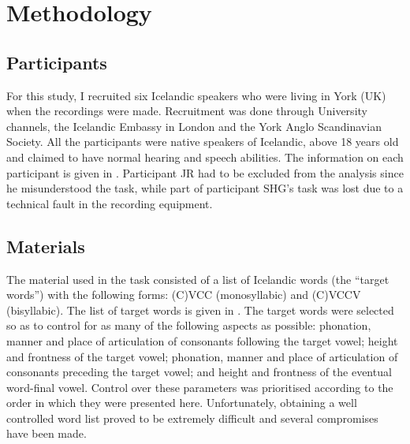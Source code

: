 \chapter{Methodology}

\section{Participants}

For this study, I recruited six Icelandic speakers who were living in York (UK) when the recordings were made.
Recruitment was done through University channels, the Icelandic Embassy in London and the York Anglo Scandinavian Society.
All the participants were native speakers of Icelandic, above 18 years old and claimed to have normal hearing and speech abilities.
The information on each participant is given in .
Participant JR had to be excluded from the analysis since he misunderstood the task, while part of participant SHG's task was lost due to a technical fault in the recording equipment.



\section{Materials}

The material used in the task consisted of a list of Icelandic words (the ``target words'') with the following forms: (C)VCC (monosyllabic) and (C)VCCV (bisyllabic).
The list of target words is given in .
The target words were selected so as to control for as many of the following aspects as possible: phonation, manner and place of articulation of consonants following the target vowel; height and frontness of the target vowel; phonation, manner and place of articulation of consonants preceding the target vowel; and height and frontness of the eventual word-final vowel.
Control over these parameters was prioritised according to the order in which they were presented here.
Unfortunately, obtaining a well controlled word list proved to be extremely difficult and several compromises have been made.

